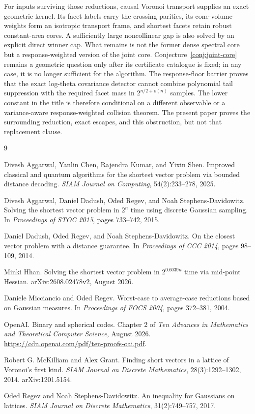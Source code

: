 \documentclass[10pt]{article}
\theoremstyle{definition}
\begin{document}
For inputs surviving those reductions, causal Voronoi transport supplies an
exact geometric kernel.  Its facet labels carry the crossing parities, its
cone-volume weights form an isotropic transport frame, and shortest facets
retain robust constant-area cores.  A sufficiently large noncollinear gap is
also solved by an explicit direct winner cap.  What remains is not the former
dense spectral core but a response-weighted version of the joint core.
Conjecture~\ref{conj:joint-core} remains a geometric question only after its
certificate catalogue is fixed; in any case, it is no longer sufficient for
the algorithm.  The response-floor barrier proves that the exact log-theta
covariance detector cannot combine polynomial tail suppression with the
required facet mass in $2^{n/2+o(n)}$ samples.  The lower constant in the
title is therefore conditional on a different observable or a variance-aware
response-weighted collision theorem.  The present paper proves the
surrounding reduction, exact escapes, and this obstruction, but not that
replacement clause.

\begin{thebibliography}{9}
\raggedright

Divesh Aggarwal, Yanlin Chen, Rajendra Kumar, and Yixin Shen.
\newblock Improved classical and quantum algorithms for the shortest vector
problem via bounded distance decoding.
\newblock \emph{SIAM Journal on Computing}, 54(2):233--278, 2025.

Divesh Aggarwal, Daniel Dadush, Oded Regev, and Noah
Stephens-Davidowitz.
\newblock Solving the shortest vector problem in $2^n$ time using discrete
Gaussian sampling.
\newblock In \emph{Proceedings of STOC 2015}, pages 733--742, 2015.

Daniel Dadush, Oded Regev, and Noah Stephens-Davidowitz.
\newblock On the closest vector problem with a distance guarantee.
\newblock In \emph{Proceedings of CCC 2014}, pages 98--109, 2014.

Minki Hhan.
Solving the shortest vector problem in $2^{0.6039n}$ time via
mid-point Hessian.
arXiv:2608.02478v2, August 2026.

Daniele Micciancio and Oded Regev.
\newblock Worst-case to average-case reductions based on Gaussian measures.
\newblock In \emph{Proceedings of FOCS 2004}, pages 372--381, 2004.

OpenAI.
\newblock Binary and spherical codes.
\newblock Chapter 2 of \emph{Ten Advances in Mathematics and Theoretical
Computer Science}, August 2026.
\newblock \url{https://cdn.openai.com/pdf/ten-proofs-oai.pdf}.

Robert G. McKilliam and Alex Grant.
\newblock Finding short vectors in a lattice of Voronoi's first kind.
\newblock \emph{SIAM Journal on Discrete Mathematics},
28(3):1292--1302, 2014.
\newblock arXiv:1201.5154.

Oded Regev and Noah Stephens-Davidowitz.
\newblock An inequality for Gaussians on lattices.
\newblock \emph{SIAM Journal on Discrete Mathematics}, 31(2):749--757, 2017.

\end{thebibliography}
\end{document}
